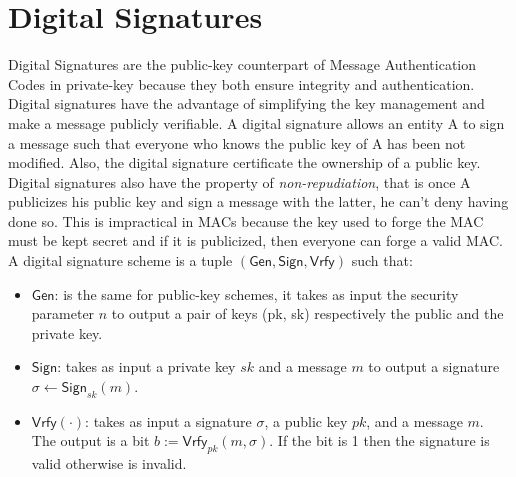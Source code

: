 \section{Digital Signatures}
Digital Signatures are the public-key counterpart of Message Authentication Codes in private-key because they both ensure integrity and authentication. Digital signatures have the advantage of simplifying the key management and make a message publicly verifiable.
A digital signature allows an entity A to sign a message such that everyone who knows the public key of A has been not modified. Also, the digital signature certificate the ownership of a public key.\\
Digital signatures also have the property of \emph{non-repudiation}, that is once A publicizes his public key and sign a message with the latter, he can't deny having done so. This is impractical in MACs because the key used to forge the MAC must be kept secret and if it is publicized, then everyone can forge a valid MAC.\\
A digital signature scheme is a tuple $(\mathsf{Gen}, \mathsf{Sign}, \mathsf{Vrfy})$ such that:
\begin{itemize}
    \item{$\mathsf{Gen}$}: is the same for public-key schemes, it takes as input the security parameter $n$ to output a pair of keys (pk, sk) respectively the public and the private key.
    \item{$\mathsf{Sign}$}: takes as input a private key $sk$ and a message $m$ to output a signature $\sigma \leftarrow \mathsf{Sign}_{sk}(m)$.
    \item{$\mathsf{Vrfy}(\cdot)$}: takes as input a signature $\sigma$, a public key $pk$, and a message $m$. The output is a bit $b := \mathsf{Vrfy}_{pk}(m, \sigma)$. If the bit is 1 then the signature is valid otherwise is invalid.
\end{itemize}

